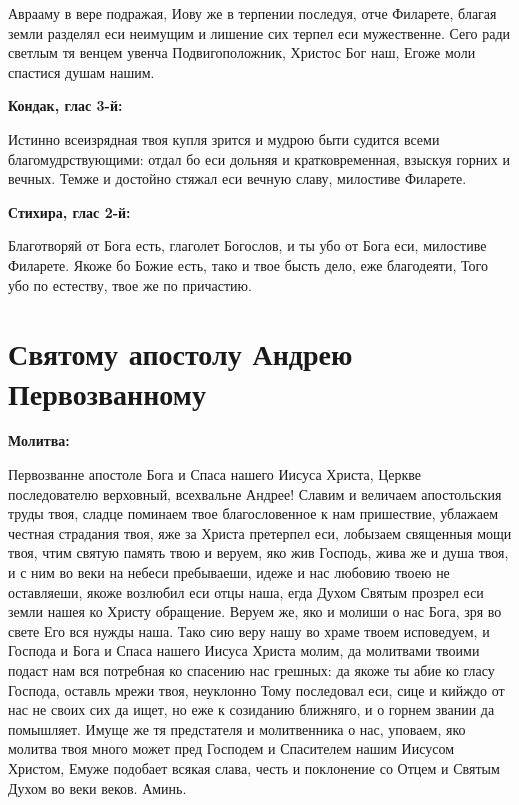 Аврааму в вере подражая, Иову же в терпении последуя, отче Филарете, благая земли разделял еси неимущим и лишение сих терпел еси мужественне. Сего ради светлым тя венцем увенча Подвигоположник, Христос Бог наш, Егоже моли спастися душам нашим.


\medskip
\bfseries Кондак, глас 3-й:\normalfont{}

Истинно всеизрядная твоя купля зрится и мудрою быти судится всеми благомудрствующими: отдал бо еси дольняя и кратковременная, взыскуя горних и вечных. Темже и достойно стяжал еси вечную славу, милостиве Филарете.


\medskip
\bfseries Стихира, глас 2-й:\normalfont{}


Благотворяй от Бога есть, глаголет Богослов, и ты убо от Бога еси, милостиве Филарете. Якоже бо Божие есть, тако и твое бысть дело, еже благодеяти, Того убо по естеству, твое же по причастию.

 



\section{Святому апостолу Андрею Первозванному}
 
\bfseries Молитва:\normalfont{}


Первозванне апостоле Бога и Спаса нашего Иисуса Христа, Церкве последователю верховный, всехвальне Андрее! Славим и величаем апостольския труды твоя, сладце поминаем твое благословенное к нам пришествие, ублажаем честная страдания твоя, яже за Христа претерпел еси, лобызаем священныя мощи твоя, чтим святую память твою и веруем, яко жив Господь, жива же и душа твоя, и с ним во веки на небеси пребываеши, идеже и нас любовию твоею не оставляеши, якоже возлюбил еси отцы наша, егда Духом Святым прозрел еси земли нашея ко Христу обращение. Веруем же, яко и молиши о нас Бога, зря во свете Его вся нужды наша. Тако сию веру нашу во храме твоем исповедуем, и Господа и Бога и Спаса нашего Иисуса Христа молим, да молитвами твоими подаст нам вся потребная ко спасению нас грешных: да якоже ты абие ко гласу Господа, оставль мрежи твоя, неуклонно Тому последовал еси, сице и кийждо от нас не своих сих да ищет, но еже к созиданию ближняго, и о горнем звании да помышляет. Имуще же тя предстателя и молитвенника о нас, уповаем, яко молитва твоя много может пред Господем и Спасителем нашим Иисусом Христом, Емуже подобает всякая слава, честь и поклонение со Отцем и Святым Духом во веки веков. Аминь. 



